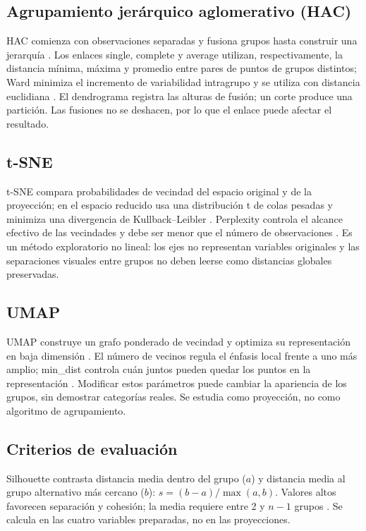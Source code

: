 \documentclass[11pt]{article}
\begin{document}
\subsection{Agrupamiento jerárquico aglomerativo (HAC)}
HAC comienza con observaciones separadas y fusiona grupos hasta construir
una jerarquía \cite{murtagh2012}. Los enlaces single, complete y average
utilizan, respectivamente, la distancia mínima, máxima y promedio entre
pares de puntos de grupos distintos; Ward minimiza el incremento de
variabilidad intragrupo y se utiliza con distancia euclidiana
\cite{scipylinkage}. El dendrograma registra las alturas de fusión; un corte
produce una partición. Las fusiones no se deshacen, por lo que el enlace
puede afectar el resultado.

\subsection{t-SNE}
t-SNE compara probabilidades de vecindad del espacio original y de la
proyección; en el espacio reducido usa una distribución t de colas pesadas
y minimiza una divergencia de Kullback--Leibler \cite{vandermaaten2008}.
Perplexity controla el alcance efectivo de las vecindades y debe ser menor
que el número de observaciones \cite{sklearntsne}. Es un método exploratorio
no lineal: los ejes no representan variables originales y las separaciones
visuales entre grupos no deben leerse como distancias globales preservadas.

\subsection{UMAP}
UMAP construye un grafo ponderado de vecindad y optimiza su representación
en baja dimensión \cite{mcinnes2018}. El número de vecinos regula el énfasis
local frente a uno más amplio; min\_dist controla cuán juntos pueden quedar
los puntos en la representación \cite{umapparams}. Modificar estos parámetros
puede cambiar la apariencia de los grupos, sin demostrar categorías reales.
Se estudia como proyección, no como algoritmo de agrupamiento.

\subsection{Criterios de evaluación}
Silhouette contrasta distancia media dentro del grupo ($a$) y distancia
media al grupo alternativo más cercano ($b$):
$s=(b-a)/\max(a,b)$. Valores altos favorecen separación y cohesión; la media
requiere entre 2 y $n-1$ grupos \cite{sklearnsilhouette}.
Se calcula en las cuatro variables preparadas, no en las proyecciones.
\end{document}
